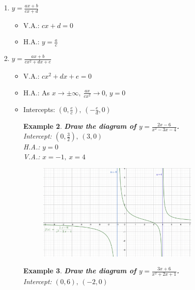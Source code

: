 \documentclass[12pt, a4paper]{article}
\newtheorem{example}{Example}[subsection]
\begin{document}
\begin{enumerate}
\begin{itemize}
\begin{example}
\begin{figure}[H]
            \end{figure}
        \end{example}
    \end{itemize}
    \item $\displaystyle y=\frac{ax+b}{cx+d}$
    \begin{itemize}
        \item V.A.: $cx+d=0$
        \item H.A.: $y=\displaystyle\frac{a}{c}$
    \end{itemize}
    \item $\displaystyle y=\frac{ax+b}{cx^2+dx+e}$
    \begin{itemize}
        \item V.A.: $cx^2+dx+e=0$
        \item H.A.: As $\displaystyle x\to\pm\infty,\ \frac{ax}{cx^2}\to 0$, $y=0$
        \item Intercepts: $\displaystyle\left(0,\frac{e}{c}\right),\ \left(-\frac{e}{d},0\right)$
        \begin{example}
            \textbf{Draw the diagram of $\displaystyle y=\frac{2x-6}{x^2-3x-4}$.}\\
            Intercept: $\displaystyle\left(0,\frac{3}{2}\right),\ \left(3,0\right)$\\
            H.A.: $y=0$\\
            V.A.: $x=-1,\ x=4$
            \begin{figure}[H]
                \centering
                \includegraphics[width=0.8\textwidth]{Fig.2.5.jpg}
            \end{figure}
        \end{example}
        \begin{example}
            \textbf{Draw the diagram of $\displaystyle y=\frac{3x+6}{x^2+2x+1}$.}\\
            Intercept: $\displaystyle\left(0,6\right),\ \left(-2,0\right)$\\

\end{example}
\end{itemize}
\end{enumerate}
\end{document}
